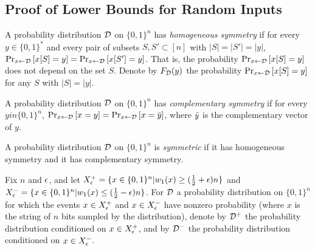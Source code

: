 \subsection{Proof of Lower Bounds for Random Inputs}



\begin{definition}
A probability distribution $\mathcal{D}$ on $\{0, 1\}^n$ has \emph{homogeneous
symmetry} if for every $y \in \{0, 1\}^*$ and every pair of subsets $S, S' \subset [n]$
with $|S| = |S'| = |y|$, 
$\text{Pr}_{x \leftarrow \mathcal{D}}\left[x[S] = y\right] = \text{Pr}_{x \leftarrow \mathcal{D}}\left[x[S'] = y\right]$.
That is, the probability $\text{Pr}_{x \leftarrow \mathcal{D}}\left[x[S] = y\right]$ does not depend
on the set $S$. Denote by $F_{\mathcal{D}}(y)$ the probability
$\text{Pr}_{x \leftarrow \mathcal{D}}\left[x[S] = y\right]$ for any $S$ with $|S| = |y|$.

A probability distribution $\mathcal{D}$ on $\{0, 1\}^n$ has \emph{complementary symmetry} if for every
$y in \{0, 1\}^n$, $\text{Pr}_{x \leftarrow \mathcal{D}}\left[x = y\right] = \text{Pr}_{x \leftarrow \mathcal{D}}\left[x = \bar{y}\right]$,
where $\bar{y}$ is the complementary vector of $y$.

A probability distribution $\mathcal{D}$ on $\{0, 1\}^n$ is \emph{symmetric} if it has homogeneous symmetry
and it has complementary symmetry. 
\end{definition}

Fix $n$ and $\epsilon$, and let $X^+_\epsilon = \{x \in \{0, 1\}^n | w_1(x) \geq (\frac{1}{2}+\epsilon )n \}$
and $X^-_\epsilon = \{x \in \{0, 1\}^n | w_1(x) \leq (\frac{1}{2}-\epsilon )n \}$.
For $\mathcal{D}$ a probability distribution on $\{0, 1\}^n$ for which
the events $x \in X^+_\epsilon$ and $x \in X^-_\epsilon$ have nonzero probability (where $x$
is the string of $n$ bits sampled by the distribution), 
denote by $\mathcal{D}^+$ the probability distribution conditioned on $x \in X^+_\epsilon$,
and by $\mathcal{D}^-$ the probability distribution conditioned on $x \in X^-_\epsilon$.


